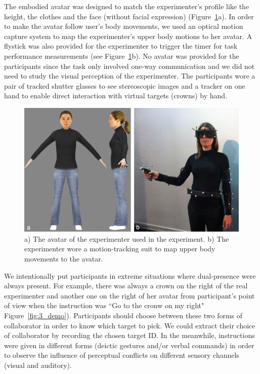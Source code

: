 The embodied avatar was designed to match the experimenter's profile like the height, the clothes and the face (without facial expression) (Figure~\ref{fig:3_avatar}a). In order to make the avatar follow user's body movements, we used an optical motion capture system to map the experimenter's upper body motions to her avatar. A flystick was also provided for the experimenter to trigger the timer for task performance measurements (see Figure~\ref{fig:3_avatar}b). No avatar was provided for the participants since the task only involved one-way communication and we did not need to study the visual perception of the experimenter. The participants wore a pair of tracked shutter glasses to see stereoscopic images and a tracker on one hand to enable direct interaction with virtual targets (crowns) by hand.

\begin{figure}[htb]
  \centering
  \includegraphics[width=.9\textwidth]{figures/ch3/avatar_photo}
  \caption{\label{fig:3_avatar}a) The avatar of the experimenter used in the experiment. b) The experimenter wore a motion-tracking suit to map upper body movements to the avatar.}
\end{figure}

We intentionally put participants in extreme situations where dual-presence were always present. For example, there was always a crown on the right of the real experimenter and another one on the right of her avatar from participant's point of view when the instruction was ``Go to the cronw on my right" Figure~\ref{fig:3_demo}). Participants should choose between these two forms of collaborator in order to know which target to pick. We could extract their choice of collaborator by recording the chosen target ID. In the meanwhile, instructions were given in different forms (deictic gestures and/or verbal commands) in order to observe the influence of perceptual conflicts on different sensory channels (visual and auditory).

